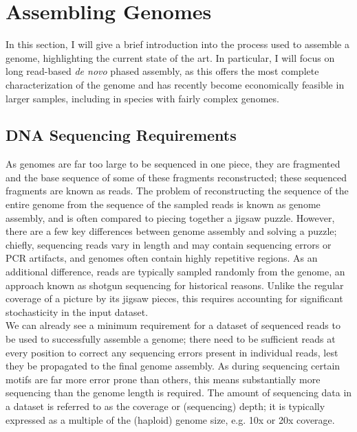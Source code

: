 

\newpage
\section*{Assembling Genomes}

In this section, I will give a brief introduction into the process used to assemble a genome, highlighting the current state of the art.
In particular, I will focus on long read-based \textit{de novo} phased assembly, as this offers the most complete characterization of the genome and has recently become economically feasible in larger samples, including in species with fairly complex genomes.

\subsection*{DNA Sequencing Requirements}

As genomes are far too large to be sequenced in one piece, they are fragmented and the base sequence of some of these fragments reconstructed; these sequenced fragments are known as reads.
The problem of reconstructing the sequence of the entire genome from the sequence of the sampled reads is known as genome assembly, and is often compared to piecing together a jigsaw puzzle.
However, there are a few key differences between genome assembly and solving a puzzle; chiefly, sequencing reads vary in length and may contain sequencing errors or PCR artifacts, and genomes often contain highly repetitive regions.
As an additional difference, reads are typically sampled randomly from the genome, an approach known as shotgun sequencing for historical reasons\cite{anderson81, green97}.
Unlike the regular coverage of a picture by its jigsaw pieces, this requires accounting for significant stochasticity in the input dataset.\\
We can already see a minimum requirement for a dataset of sequenced reads to be used to successfully assemble a genome; there need to be sufficient reads at every position to correct any sequencing errors present in individual reads, lest they be propagated to the final genome assembly.
As during sequencing certain motifs are far more error prone than others, this means substantially more sequencing than the genome length is required.
The amount of sequencing data in a dataset is referred to as the coverage or (sequencing) depth; it is typically expressed as a multiple of the (haploid) genome size, e.g\@. 10x or 20x coverage.

